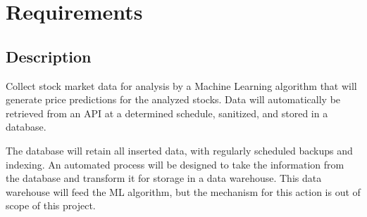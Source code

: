 \newpage




\chapter{Requirements}
\label{Requirements}
\section{Description}
  Collect stock market data for analysis by a Machine Learning algorithm that will generate price predictions for the analyzed stocks. Data will automatically be retrieved from an API at a determined schedule, sanitized, and stored in a database.\par
  The database will retain all inserted data, with regularly scheduled backups and indexing. An automated process will be designed to take the information from the database and transform it for storage in a data warehouse. This data warehouse will feed the ML algorithm, but the mechanism for this action is out of scope of this project.
